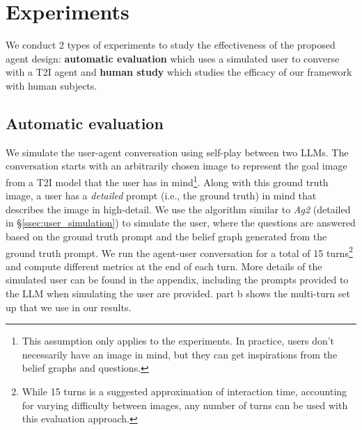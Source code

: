 \section{Experiments}
\label{sec:exp}
We conduct 2 types of experiments to study the effectiveness of the proposed agent design: \textbf{automatic evaluation} which uses a simulated user to converse with a T2I agent and \textbf{human study} which studies the efficacy of our framework with human subjects.

\vspace{-.5em}
\subsection{Automatic evaluation}
\label{ssec:automatic_eval}
\vspace{-.5em}
We simulate the user-agent conversation using self-play \citep{shah2018buildingconversationalagentovernight} between two LLMs. The conversation starts with an arbitrarily chosen image to represent the goal image from a T2I model that the user has in mind\footnote{This assumption only applies to the experiments. In practice, users don't necessarily have an image in mind, but they can get inspirations from the belief graphs and questions.}. %
Along with this ground truth image, a user has a \emph{detailed} prompt (i.e., the ground truth) in mind that describes the image in high-detail. We use the algorithm similar to \emph{Ag2} (detailed in \S\ref{ssec:user_simulation}) to simulate the user, where the questions are answered based on the ground truth prompt and the belief graph generated from the ground truth prompt. We run the agent-user conversation for a total of 15 turns\footnote{While 15 turns is a suggested approximation of interaction time, accounting for varying difficulty between images,  any number of turns can be used with this evaluation approach.} and compute different metrics at the end of each turn. More details of the simulated user can be found in the appendix, including the prompts provided to the LLM when simulating the user are provided.  part b shows the multi-turn set up that we use in our results. %

